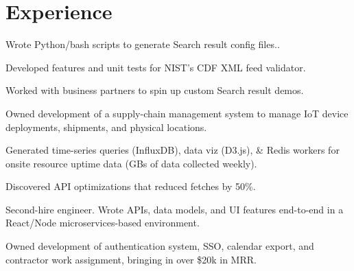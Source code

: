 \documentclass[]{deedy-resume-openfont}
\begin{document}
\hfill
\begin{minipage}[t]{0.66\textwidth}


\section{Experience}
\sectionsep

\vspace{\topsep}
\begin{tightemize}

\item Wrote Python/bash scripts to generate Search result config files..
\item Developed features and unit tests for NIST's CDF XML feed validator.
\item Worked with business partners to spin up custom Search result demos.

\end{tightemize}
\sectionsep

\begin{tightemize}

\item Owned development of a supply-chain management system to manage IoT device deployments, shipments, and physical locations.
\item Generated time-series queries (InfluxDB), data viz (D3.js), \& Redis workers for onsite resource uptime data (GBs of data collected weekly).
\item Discovered API optimizations that reduced fetches by 50\%.

\end{tightemize}
\sectionsep


\begin{tightemize}

\item Second-hire engineer. Wrote APIs, data models, and UI features end-to-end in a React/Node microservices-based environment.
\item Owned development of authentication system, SSO, calendar export, and contractor work assignment, bringing in over \$20k in MRR.


\end{tightemize}
\end{minipage}
\end{document}
